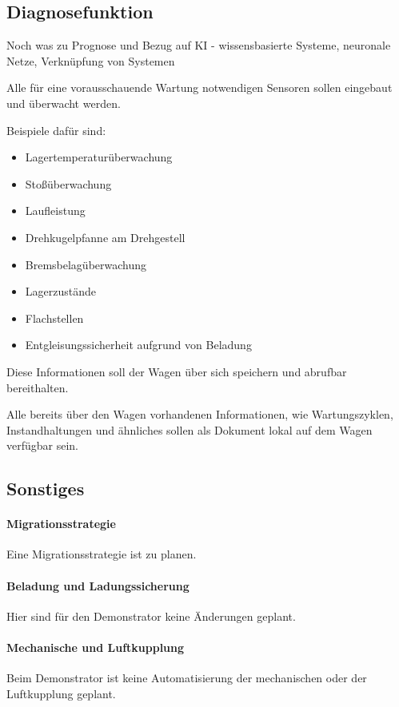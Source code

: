\subsection{Diagnosefunktion}
Noch was zu Prognose und Bezug auf KI - wissensbasierte Systeme, neuronale Netze, Verknüpfung von Systemen
\begin{feat}
Alle für eine vorausschauende Wartung notwendigen Sensoren sollen eingebaut und überwacht werden.
\end{feat}
\begin{rem} [zu Anf. 56]
Beispiele dafür sind:
\begin{itemize}
    \item Lagertemperaturüberwachung
    \item Stoßüberwachung
    \item Laufleistung
    \item Drehkugelpfanne am Drehgestell
    \item Bremsbelagüberwachung
    \item Lagerzustände
    \item Flachstellen
    \item Entgleisungssicherheit aufgrund von Beladung
\end{itemize}
\end{rem}
\begin{feat}
Diese Informationen soll der Wagen über sich speichern und abrufbar bereithalten.
\end{feat}
\begin{feat}
Alle bereits über den Wagen vorhandenen Informationen, wie Wartungszyklen, Instandhaltungen und ähnliches sollen als Dokument lokal auf dem Wagen  verfügbar sein.
\end{feat}

\subsection{Sonstiges}
\paragraph{Migrationsstrategie}
\begin{feat}
Eine Migrationsstrategie ist zu planen.
\end{feat}
\paragraph{Beladung und Ladungssicherung}
Hier sind für den Demonstrator keine Änderungen geplant.
\paragraph{Mechanische und Luftkupplung}
Beim Demonstrator ist keine Automatisierung der mechanischen oder der Luftkupplung geplant.
